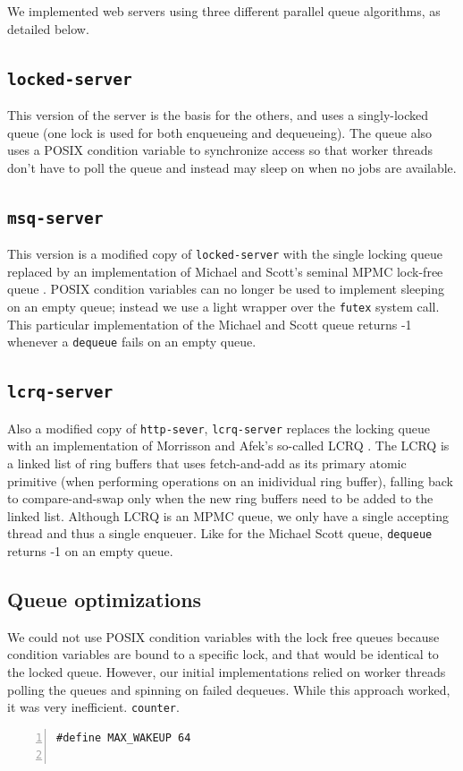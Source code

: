 \documentclass[twoside,10pt]{article}
\begin{document}
\begin{multicols}{2}
We implemented web servers using three different parallel queue
algorithms, as detailed below.

\subsection{\texttt{locked-server}}

This version of the server is the basis for the others, and uses a
singly-locked queue (one lock is used for both enqueueing and
dequeueing). The queue also uses a POSIX condition variable to synchronize
access so that worker threads don't have to poll the queue and instead may
sleep on when no jobs are available.

\subsection{\texttt{msq-server}}

This version is a modified copy of \verb+locked-server+ with the single
locking queue replaced by an implementation of Michael and Scott's
seminal MPMC lock-free queue \cite{synch-1.0.1}. POSIX
condition variables can no longer be used to implement sleeping on an
empty queue; instead we use a light wrapper over the \verb+futex+ system
call. This particular implementation of the Michael and Scott queue
returns -1 whenever a \verb+dequeue+ fails on an empty queue. 

\subsection{\texttt{lcrq-server}}

Also a modified copy of \verb+http-sever+, \verb+lcrq-server+ replaces
the locking queue with an implementation of Morrisson and Afek's
so-called LCRQ \cite{lcrq-source}. The LCRQ is a linked list of ring buffers that uses
fetch-and-add as its primary atomic primitive (when performing
operations on an inidividual ring buffer), falling back to
compare-and-swap only when the new ring buffers need to be added to
the linked list. Although LCRQ is an MPMC queue, we only have a single
accepting thread and thus a single enqueuer. Like for the Michael
Scott queue, \verb+dequeue+ returns -1 on an empty queue. 

\subsection{Queue optimizations}

We could not use POSIX condition variables with the lock free queues
because condition variables are bound to a specific lock, and that
would be identical to the locked queue. However, our initial
implementations relied on worker threads polling the queues and
spinning on failed dequeues. While this approach worked, it was very
inefficient. 
\verb+counter+.
\begin{Verbatim}[numbers=left,
                 fontsize=\small]
#define MAX_WAKEUP 64


\end{Verbatim}
\end{multicols}
\end{document}

